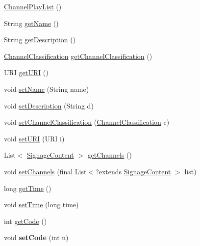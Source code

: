 \begin{DoxyCompactItemize}
\item 
\hyperlink{classgov_1_1fnal_1_1ppd_1_1dd_1_1channel_1_1ChannelPlayList_af6a62dd284fed342597292000aece6c3}{Channel\-Play\-List} ()
\item 
String \hyperlink{classgov_1_1fnal_1_1ppd_1_1dd_1_1channel_1_1ChannelPlayList_a1c2d3e0fcb9cee5cad06dc3d7bdb96e9}{get\-Name} ()
\item 
String \hyperlink{classgov_1_1fnal_1_1ppd_1_1dd_1_1channel_1_1ChannelPlayList_a1b1c73554407ef5d5f8f7f3b239a1f12}{get\-Description} ()
\item 
\hyperlink{classgov_1_1fnal_1_1ppd_1_1dd_1_1changer_1_1ChannelClassification}{Channel\-Classification} \hyperlink{classgov_1_1fnal_1_1ppd_1_1dd_1_1channel_1_1ChannelPlayList_a8e1ce06c00064455483d664b4d0fef17}{get\-Channel\-Classification} ()
\item 
U\-R\-I \hyperlink{classgov_1_1fnal_1_1ppd_1_1dd_1_1channel_1_1ChannelPlayList_a6f2e7a1655fb99a2e711c225912d2d79}{get\-U\-R\-I} ()
\item 
void \hyperlink{classgov_1_1fnal_1_1ppd_1_1dd_1_1channel_1_1ChannelPlayList_add9a4e4bdd0370b68ed3190ba1677070}{set\-Name} (String name)
\item 
void \hyperlink{classgov_1_1fnal_1_1ppd_1_1dd_1_1channel_1_1ChannelPlayList_a1321936810234139f911c5a1c7d6a7af}{set\-Description} (String d)
\item 
void \hyperlink{classgov_1_1fnal_1_1ppd_1_1dd_1_1channel_1_1ChannelPlayList_a145fde3f59f8025e8c79117024d5d3ab}{set\-Channel\-Classification} (\hyperlink{classgov_1_1fnal_1_1ppd_1_1dd_1_1changer_1_1ChannelClassification}{Channel\-Classification} c)
\item 
void \hyperlink{classgov_1_1fnal_1_1ppd_1_1dd_1_1channel_1_1ChannelPlayList_a7bb16de560ccbd745ee6a4f12e7756ae}{set\-U\-R\-I} (U\-R\-I i)
\item 
List$<$ \hyperlink{interfacegov_1_1fnal_1_1ppd_1_1dd_1_1signage_1_1SignageContent}{Signage\-Content} $>$ \hyperlink{classgov_1_1fnal_1_1ppd_1_1dd_1_1channel_1_1ChannelPlayList_a4a45d0e640ddc2548f37bd6c1c997f11}{get\-Channels} ()
\item 
void \hyperlink{classgov_1_1fnal_1_1ppd_1_1dd_1_1channel_1_1ChannelPlayList_abfcd48d8d992007dd8b7afd3ea1e1dd2}{set\-Channels} (final List$<$?extends \hyperlink{interfacegov_1_1fnal_1_1ppd_1_1dd_1_1signage_1_1SignageContent}{Signage\-Content} $>$ list)
\item 
long \hyperlink{classgov_1_1fnal_1_1ppd_1_1dd_1_1channel_1_1ChannelPlayList_aeffef12153803eb9b53b8465605926a9}{get\-Time} ()
\item 
void \hyperlink{classgov_1_1fnal_1_1ppd_1_1dd_1_1channel_1_1ChannelPlayList_ac1efd270a0a6ac0c723a6cbd7d97b9a5}{set\-Time} (long time)
\item 
int \hyperlink{classgov_1_1fnal_1_1ppd_1_1dd_1_1channel_1_1ChannelPlayList_a63f0a55d5f714b9b510b5d9b52ab5294}{get\-Code} ()
\item 
\hypertarget{classgov_1_1fnal_1_1ppd_1_1dd_1_1channel_1_1ChannelPlayList_a054421b30bfa598b9f907facbba2dc6c}{void {\bfseries set\-Code} (int n)}\label{classgov_1_1fnal_1_1ppd_1_1dd_1_1channel_1_1ChannelPlayList_a054421b30bfa598b9f907facbba2dc6c}


\end{DoxyCompactItemize}
